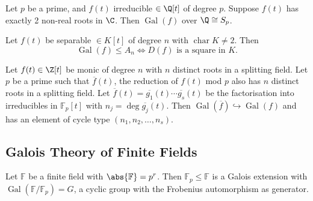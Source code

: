 \documentclass{article}
\DeclareMathOperator{\chara}{char}
\DeclareMathOperator{\Gal}{Gal}
\newcommand{\F}{\mathbb{F}}
\begin{document}
\begin{nthm}\label{thm:3.8}
    Let $p$ be a prime, and $f(t)$ irreducible $\in \Q[t]$ of degree $p$.
    Suppose $f(t)$ has exactly 2 non-real roots in $\C$.
    Then $\Gal(f)$ over $\Q \cong S_p$.
\end{nthm}





\begin{nlemma}\label{lem:3.11}
    Let $f(t)$ be separable $\in K[t]$ of degree $n$ with $\chara K \neq 2$.
    Then
    \begin{equation*}\Gal(f) \leq A_n \iff D(f)\text{ is a square in }K.\end{equation*}
\end{nlemma}









\begin{nthm}\label{thm:3.13}
    Let $f(t) \in \Z[t]$ be monic of degree $n$ with $n$ distinct roots in a splitting field.
    Let $p$ be a prime such that $\overline{f}(t)$, the reduction of $f(t)$ mod $p$ also has $n$ distinct roots in a splitting field.
    Let $\overline{f}(t) = \overline{g_1}(t) \dotsm \overline{g_s}(t)$ be the factorisation into irreducibles in $\F_p[t]$ with $n_j = \deg \overline{g_j}(t)$.
    Then $\Gal(\overline{f}) \hookrightarrow \Gal(f)$ and has an element of cycle type $(n_1, n_2, \dotsc, n_s)$.
\end{nthm}


\subsection{Galois Theory of Finite Fields}






















\begin{nthm}\label{thm:3.16}
    Let $\F$ be a finite field with $\abs{\F} = p^r$.
    Then $\F_p \leq \F$ is a Galois extension with $\Gal(\F/\F_p) = G$, a cyclic group with the Frobenius automorphism as generator.
\end{nthm}
\end{document}
